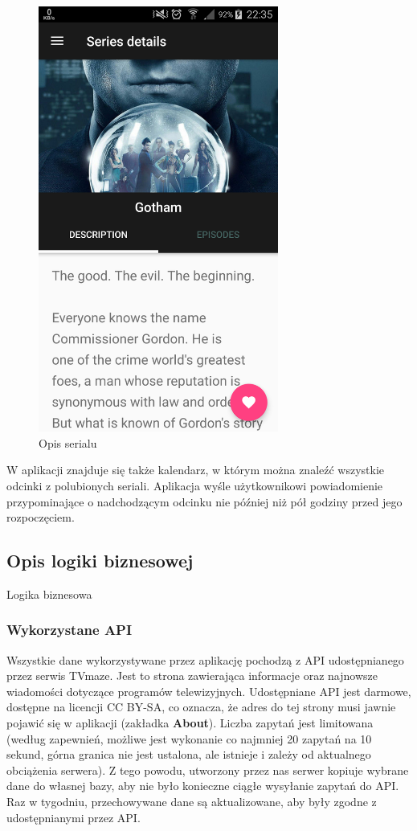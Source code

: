 \documentclass[10pt,a4paper]{article}
\begin{document}
\begin{figure}[H]
	\centering
	\includegraphics[height=14cm]{Resources/Images/details.png}
	\caption{Opis serialu}
\end{figure}
\noindent
W aplikacji znajduje się także kalendarz, w którym można znaleźć wszystkie odcinki z polubionych seriali. Aplikacja wyśle użytkownikowi powiadomienie przypominające o nadchodzącym odcinku nie później niż pół godziny przed jego rozpoczęciem.

\newpage
\subsection{Opis logiki biznesowej}
Logika biznesowa

\subsubsection{Wykorzystane API}
Wszystkie dane wykorzystywane przez aplikację pochodzą z API udostępnianego przez serwis TVmaze. Jest to strona zawierająca informacje oraz najnowsze wiadomości dotyczące programów telewizyjnych. Udostępniane API jest darmowe, dostępne na licencji CC BY-SA, co oznacza, że adres do tej strony musi jawnie pojawić się w aplikacji (zakładka \textbf{About}). Liczba zapytań jest limitowana (według zapewnień, możliwe jest wykonanie co najmniej 20 zapytań na 10 sekund, górna granica nie jest ustalona, ale istnieje i zależy od aktualnego obciążenia serwera). Z tego powodu, utworzony przez nas serwer kopiuje wybrane dane do własnej bazy, aby nie było konieczne ciągłe wysyłanie zapytań do API. Raz w tygodniu, przechowywane dane są aktualizowane, aby były zgodne z udostępnianymi przez API.
\end{document}
